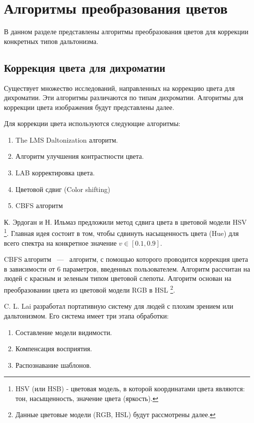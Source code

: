 \documentclass[a4paper,14pt, unknownkeysallowed]{extreport}
\begin{document}
    \section{Алгоритмы преобразования цветов}
    В данном разделе представлены алгоритмы преобразования цветов для коррекции конкретных типов дальтонизма.

    \subsection{Коррекция цвета для дихроматии}

    Существует множество исследований, направленных на коррекцию цвета для дихроматии. Эти алгоритмы различаются по типам дихроматии. 
    Алгоритмы для коррекции цвета изображения будут представлены далее. 
    
    Для коррекции цвета используются следующие алгоритмы:

    \begin{enumerate}
        \item The LMS Daltonization алгоритм.
        \item Алгоритм улучшения контрастности цвета.
        \item LAB корректировка цвета.
        \item Цветовой сдвиг (Color shifting)
        \item CBFS алгоритм
    \end{enumerate}

    К. Эрдоган и Н. Ильмаз предложили метод сдвига цвета в цветовой модели HSV \footnote{HSV (или HSB) - цветовая модель, в которой координатами цвета являются: тон, насыщенность, значение цвета (яркость).}. Главная идея состоит в том, чтобы сдвинуть насыщенность цвета (Hue) для всего спектра на конкретное значение $v \in [0.1, 0.9]$.

    CBFS алгоритм ~---~ алгоритм, с помощью которого проводится коррекция цвета в зависимости от 6 параметров, введенных пользователем. Алгоритм рассчитан на людей с красным и зеленым типом цветовой слепоты. Алгоритм основан на преобразовании цвета из цветовой модели RGB в HSL \footnote{Данные цветовые модели (RGB, HSL) будут рассмотрены далее.}.

    C. L. Lai разработал портативную систему для людей с плохим зрением или дальтонизмом. 
    Его система имеет три этапа обработки:
    \begin{enumerate}
        \item Составление модели видимости.
        \item Компенсация восприятия.
        \item Распознавание шаблонов.
    \end{enumerate}
\end{document}
